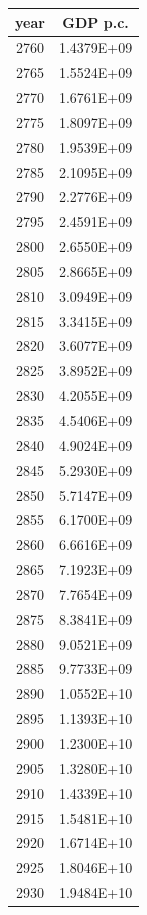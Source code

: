 \documentclass[a4paper]{article}
\begin{document}
	\begin{tabular}{|c|c|}
		\hline
		year & GDP p.c. \\
		\hline
		2760 & 1.4379E+09 \\
		\hline
		2765 & 1.5524E+09 \\
		\hline
		2770 & 1.6761E+09 \\
		\hline
		2775 & 1.8097E+09 \\
		\hline
		2780 & 1.9539E+09 \\
		\hline
		2785 & 2.1095E+09 \\
		\hline
		2790 & 2.2776E+09 \\
		\hline
		2795 & 2.4591E+09 \\
		\hline
		2800 & 2.6550E+09 \\
		\hline
		2805 & 2.8665E+09 \\
		\hline
		2810 & 3.0949E+09 \\
		\hline
		2815 & 3.3415E+09 \\
		\hline
		2820 & 3.6077E+09 \\
		\hline
		2825 & 3.8952E+09 \\
		\hline
		2830 & 4.2055E+09 \\
		\hline
		2835 & 4.5406E+09 \\
		\hline
		2840 & 4.9024E+09 \\
		\hline
		2845 & 5.2930E+09 \\
		\hline
		2850 & 5.7147E+09 \\
		\hline
		2855 & 6.1700E+09 \\
		\hline
		2860 & 6.6616E+09 \\
		\hline
		2865 & 7.1923E+09 \\
		\hline
		2870 & 7.7654E+09 \\
		\hline
		2875 & 8.3841E+09 \\
		\hline
		2880 & 9.0521E+09 \\
		\hline
		2885 & 9.7733E+09 \\
		\hline
		2890 & 1.0552E+10 \\
		\hline
		2895 & 1.1393E+10 \\
		\hline
		2900 & 1.2300E+10 \\
		\hline
		2905 & 1.3280E+10 \\
		\hline
		2910 & 1.4339E+10 \\
		\hline
		2915 & 1.5481E+10 \\
		\hline
		2920 & 1.6714E+10 \\
		\hline
		2925 & 1.8046E+10 \\
		\hline
		2930 & 1.9484E+10 \\

\end{tabular}
\end{document}
